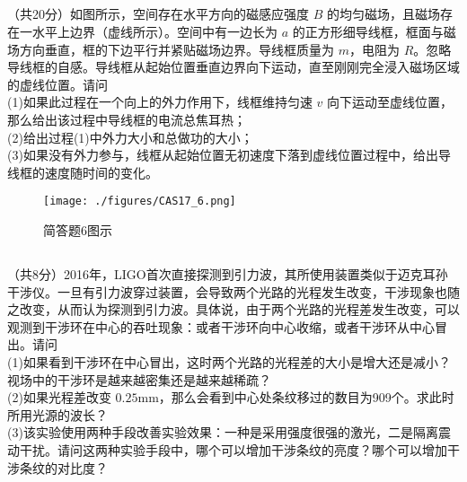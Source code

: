 \subsection{ }
（共20分）如图所示，空间存在水平方向的磁感应强度 $B$ 的均匀磁场，且磁场存在一水平上边界（虚线所示）。空间中有一边长为 $a$ 的正方形细导线框，框面与磁场方向垂直，框的下边平行并紧贴磁场边界。导线框质量为 $m$，电阻为 $R$。忽略导线框的自感。导线框从起始位置垂直边界向下运动，直至刚刚完全浸入磁场区域的虚线位置。请问\\
(1)如果此过程在一个向上的外力作用下，线框维持匀速 $v$ 向下运动至虚线位置，那么给出该过程中导线框的电流总焦耳热；\\
(2)给出过程(1)中外力大小和总做功的大小；\\
(3)如果没有外力参与，线框从起始位置无初速度下落到虚线位置过程中，给出导线框的速度随时间的变化。\\
\begin{figure}[ht]
\centering
\texttt{[image: ./figures/CAS17\_6.png]}
\caption{简答题6图示} \label{CAS17_fig6}
\end{figure}

\subsection{ }
（共8分）2016年，LIGO首次直接探测到引力波，其所使用装置类似于迈克耳孙干涉仪。一旦有引力波穿过装置，会导致两个光路的光程发生改变，干涉现象也随之改变，从而认为探测到引力波。具体说，由于两个光路的光程差发生改变，可以观测到干涉环在中心的吞吐现象：或者干涉环向中心收缩，或者干涉环从中心冒出。请问\\
(1)如果看到干涉环在中心冒出，这时两个光路的光程差的大小是增大还是减小？视场中的干涉环是越来越密集还是越来越稀疏？\\
(2)如果光程差改变 $0.25\mathrm{mm}$，那么会看到中心处条纹移过的数目为909个。求此时所用光源的波长？\\
(3)该实验使用两种手段改善实验效果：一种是采用强度很强的激光，二是隔离震动干扰。请问这两种实验手段中，哪个可以增加干涉条纹的亮度？哪个可以增加干涉条纹的对比度？